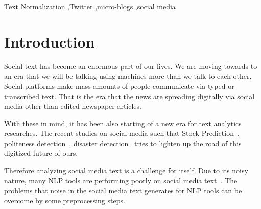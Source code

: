 \documentclass[preprint,review,12pt]{elsarticle}
\begin{document}
\begin{frontmatter}
\begin{abstract}
\end{abstract}

\begin{keyword}
Text Normalization \sep Twitter \sep micro-blogs \sep social media

\end{keyword}

\end{frontmatter}



\section{Introduction}
\label{sec:introduction}

Social text has become an enormous part of our lives. We are moving towards to an era that we will be talking using machines more than we talk to each other. Social platforms make mass amounts of people communicate via typed or transcribed text. That is the era that the news are spreading digitally via social media other than edited newspaper articles.

With these in mind, it has been also starting of a new era for text analytics researches. The recent studies on social media such that Stock Prediction~\cite{DBLP:conf/acl/SiMLLLD13}, politeness detection~\cite{DBLP:conf/acl/Danescu-Niculescu-MizilSJLP13}, disaster detection~\cite{Sakaki:2010:EST:1772690.1772777} tries to lighten up the road of this digitized future of ours.

Therefore analyzing social media text is a challenge for itself. Due to its noisy nature, many NLP tools are performing poorly on social media text~\cite{ritter2010unsupervised}. The problems that noise in the social media text generates for NLP tools can be overcome by some preprocessing steps.
\end{document}
